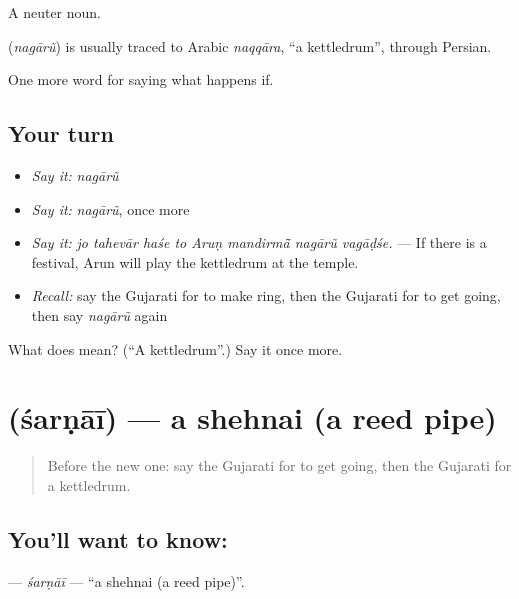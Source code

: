 A neuter noun.

\begin{cousinweb}
\textbf{} (\emph{nagārũ}) is usually traced to Arabic \emph{naqqāra}, \textquotedblleft{}a kettledrum\textquotedblright{}, through Persian.
\end{cousinweb}

\begin{grammarlens}[title={What you've built}]
One more word for saying what happens if.
\end{grammarlens}

\subsection*{Your turn}
\begin{itemize}
\raggedright
  \item \emph{Say it:} \emph{nagārũ}
  \item \emph{Say it:} \emph{nagārũ}, once more
  \item \emph{Say it:} \emph{jo tahevār haśe to Aruṇ mandirmā̃ nagārũ vagāḍśe.} — If there is a festival, Arun will play the kettledrum at the temple.
  \item \emph{Recall:} say the Gujarati for to make ring, then the Gujarati for to get going, then say \emph{nagārũ} again
\end{itemize}

\begin{tcolorbox}[breakable,colback=teal!4,colframe=teal!35!black,title={Before you move on}]
What does  mean? (\textquotedblleft{}A kettledrum\textquotedblright{}.) Say it once more.
\end{tcolorbox}
\section[\texorpdfstring{\gu{શરણાઈ} (śarṇāī)}{શરણાઈ (śarṇāī)}]{ (śarṇāī) — a shehnai (a reed pipe)}

\label{lesson:GU-C553-sarnai}



\begin{quote}
Before the new one: say the Gujarati for to get going, then the Gujarati for a kettledrum.
\end{quote}

\subsection*{You'll want to know: }
\textbf{} — \emph{śarṇāī} — \textquotedblleft{}a shehnai (a reed pipe)\textquotedblright{}.

